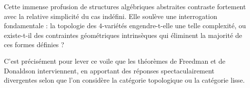 Cette immense profusion de structures algébriques abstraites contraste fortement avec la relative simplicité du cas indéfini. Elle soulève une interrogation fondamentale : la topologie des $4$-variétés engendre-t-elle une telle complexité, ou existe-t-il des contraintes géométriques intrinsèques qui éliminent la majorité de ces formes définies ?

C'est précisément pour lever ce voile que les théorèmes de Freedman et de Donaldson interviennent, en apportant des réponses spectaculairement divergentes selon que l'on considère la catégorie topologique ou la catégorie lisse.